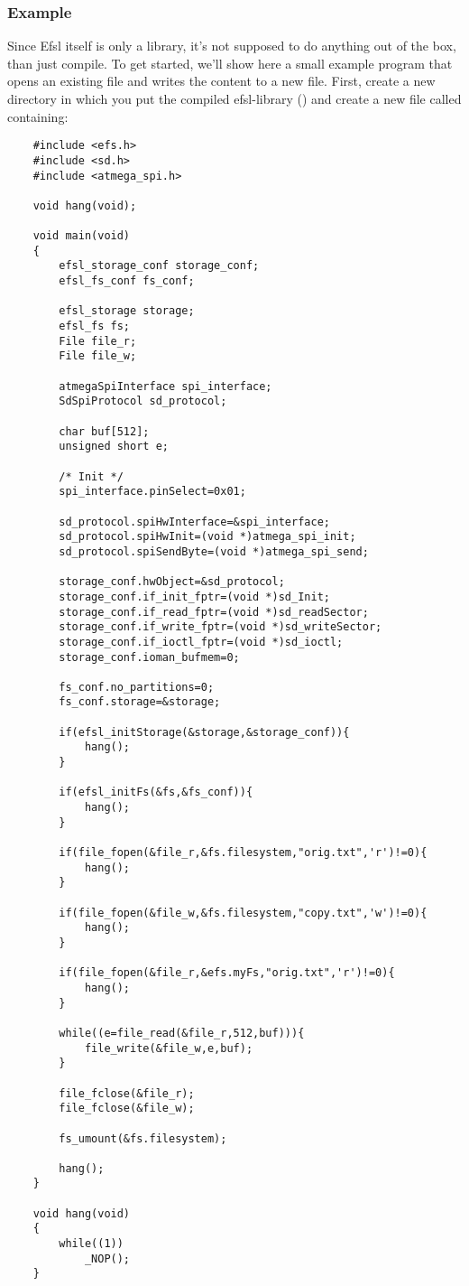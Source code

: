 \subsubsection{Example}
Since Efsl itself is only a library, it's not supposed to do anything out of
the box, than just compile. To get started, we'll show here a small example
program that opens an existing file and writes the content to a new file.
\newline\newline
First, create a new directory in which you put the compiled efsl-library
() and create a new file called  containing:
\lstset{numbers=left, stepnumber=1, numberstyle=\small, numbersep=5pt, tabsize=4}
\begin{lstlisting}
	#include <efs.h>
	#include <sd.h>
	#include <atmega_spi.h>

	void hang(void);

	void main(void)
	{
		efsl_storage_conf storage_conf;
		efsl_fs_conf fs_conf;

		efsl_storage storage;
		efsl_fs fs;
		File file_r;
		File file_w;

		atmegaSpiInterface spi_interface;
		SdSpiProtocol sd_protocol;

		char buf[512];
		unsigned short e;

		/* Init */
		spi_interface.pinSelect=0x01;

		sd_protocol.spiHwInterface=&spi_interface;
		sd_protocol.spiHwInit=(void *)atmega_spi_init;
		sd_protocol.spiSendByte=(void *)atmega_spi_send;

		storage_conf.hwObject=&sd_protocol;
		storage_conf.if_init_fptr=(void *)sd_Init;
		storage_conf.if_read_fptr=(void *)sd_readSector;
		storage_conf.if_write_fptr=(void *)sd_writeSector;
		storage_conf.if_ioctl_fptr=(void *)sd_ioctl;
		storage_conf.ioman_bufmem=0;

		fs_conf.no_partitions=0;
		fs_conf.storage=&storage;

		if(efsl_initStorage(&storage,&storage_conf)){
			hang();
		}

		if(efsl_initFs(&fs,&fs_conf)){
			hang();
		}

		if(file_fopen(&file_r,&fs.filesystem,"orig.txt",'r')!=0){
			hang();
		}

		if(file_fopen(&file_w,&fs.filesystem,"copy.txt",'w')!=0){
			hang();
		}

		if(file_fopen(&file_r,&efs.myFs,"orig.txt",'r')!=0){
			hang();
		}

		while((e=file_read(&file_r,512,buf))){
			file_write(&file_w,e,buf);
		}

		file_fclose(&file_r);
		file_fclose(&file_w);

		fs_umount(&fs.filesystem);

		hang();
	}

	void hang(void)
	{
		while((1))
			_NOP();
	}
\end{lstlisting}
